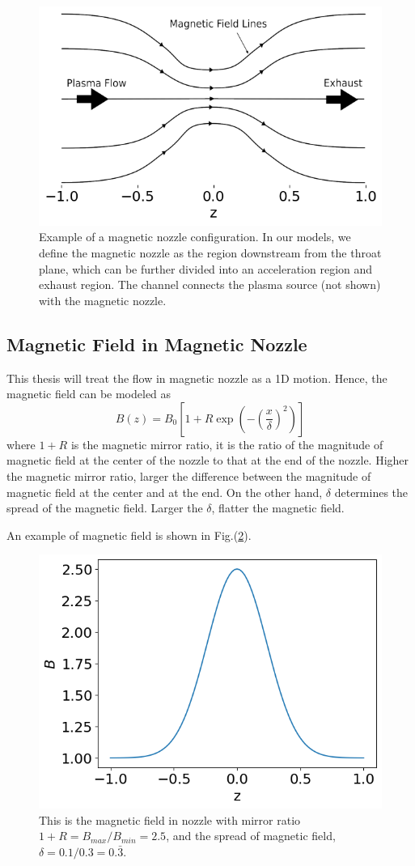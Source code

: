 \begin{figure}[htbp]
	\centering
	\includegraphics[width=0.7\linewidth]{img/magnetic-nozzle}
	\caption{Example of a magnetic nozzle configuration. In our models, we define the magnetic nozzle as the region downstream from the throat plane, which can be further divided into an acceleration region and exhaust region. The channel connects the plasma source (not shown) with the magnetic nozzle. \cite{little_performance_2015}}
	\label{fig:magnetic-nozzle}
\end{figure}

\subsection{Magnetic Field in Magnetic Nozzle} \label{sec:magnetic-field-in-nozzle}
This thesis will treat the flow in magnetic nozzle as a 1D motion. Hence, the magnetic field can be modeled as
\[ B(z) = B_0 \left[1 + R\exp(-\left(\frac{x}{\delta}\right)^2)\right] \]
where $1+R$ is the magnetic mirror ratio, it is the ratio of the magnitude of magnetic field at the center of the nozzle to that at the end of the nozzle. Higher the magnetic mirror ratio, larger the difference between the magnitude of magnetic field at the center and at the end. On the other hand, $\delta$ determines the spread of the magnetic field. Larger the $\delta$, flatter the magnetic field.

An example of magnetic field is shown in Fig.(\ref{fig:magnetic-field}).
\begin{figure}[H]
	\centering
	\includegraphics[width=0.7\linewidth]{img/magnetic-field}
	\caption{This is the magnetic field in nozzle with mirror ratio $1+R=B_{max}/B_{min}=2.5$, and the spread of magnetic field, $\delta=0.1/0.3=0.\bar{3}$. }
	\label{fig:magnetic-field}
\end{figure}

